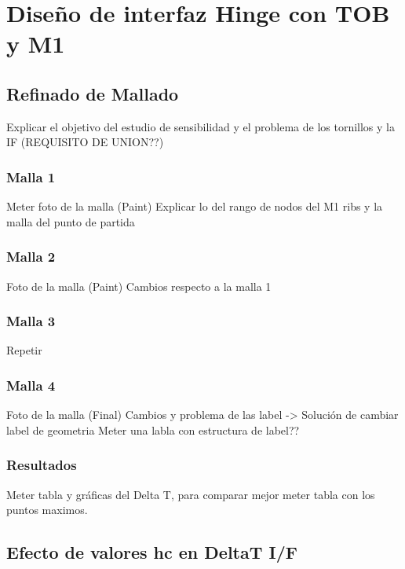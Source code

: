 \section{Diseño de interfaz Hinge con TOB y M1}

\subsection{Refinado de Mallado}

Explicar el objetivo del estudio de sensibilidad y el problema de los tornillos y la IF (REQUISITO DE UNION??)

\subsubsection{Malla 1}

Meter foto de la malla (Paint)
Explicar lo del rango de nodos del M1 ribs y la malla del punto de partida

\subsubsection{Malla 2}

Foto de la malla (Paint)
Cambios respecto a la malla 1

\subsubsection{Malla 3}

Repetir

\subsubsection{Malla 4}

Foto de la malla (Final)
Cambios y problema de las label -> Solución de cambiar label de geometria
Meter una labla con estructura de label??

\subsubsection{Resultados}

Meter tabla y gráficas del Delta T, para comparar mejor meter tabla con los puntos maximos.

\subsection{Efecto de valores hc en DeltaT I/F}

